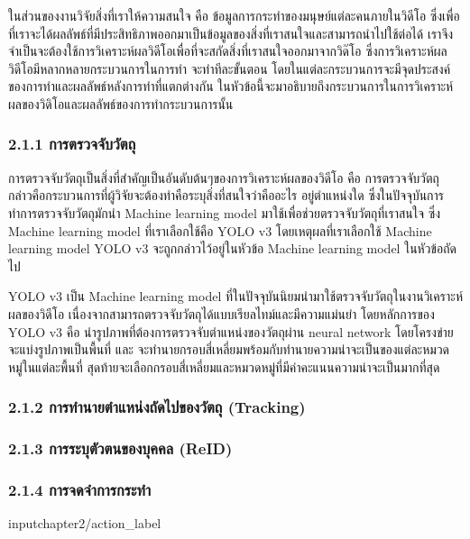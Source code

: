 ในส่วนของงานวิจัยสิ่งที่เราให้ความสนใจ คือ ข้อมูลการกระทำของมนุษย์แต่ละคนภายในวิดีโอ  ซึ่งเพื่อที่เราจะได้ผลลัพธ์ที่มีประสิทธิภาพออกมาเป็นข้อมูลของสิ่งที่เราสนใจและสามารถนำไปใช้ต่อได้ เราจึงจำเป็นจะต้องใช้การวิเคราะห์ผลวิดีโอเพื่อที่จะสกัดสิ่งที่เราสนใจออกมาจากวิด๊โอ ซึ่งการวิเคราะห์ผลวิดีโอมีหลากหลายกระบวนการในการทำ จะทำทีละขั้นตอน โดยในแต่ละกระบวนการจะมีจุดประสงค์ของการทำและผลลัพธ์หลังการทำที่แตกต่างกัน ในหัวข้อนี้จะมาอธิบายถึงกระบวนการในการวิเคราะห์ผลของวิดิโอและผลลัพธ์ของการทำกระบวนการนั้น

\subsubsection*{2.1.1 การตรวจจับวัตถุ}
การตรวจจับวัตถุเป็นสิ่งที่สำคัญเป็นอันดับต้นๆของการวิเคราะห์ผลของวิดีโอ คือ การตรวจจับวัตถุ กล่าวคือกระบวนการที่ผู้วิจัยจะต้องทำคือระบุสิ่งที่สนใจว่าคืออะไร อยู่ตำแหน่งใด ซึ่งในปัจจุบันการทำการตรวจจับวัตถุมักนำ Machine learning model มาใช้เพื่อช่วยตรวจจับวัตถุที่เราสนใจ ซึ่ง Machine learning model ที่เราเลือกใช้คือ YOLO v3 โดยเหตุผลที่เราเลือกใช้ Machine learning model YOLO v3 จะถูกกล่าวไว้อยู่ในหัวข้อ Machine learning model ในหัวข้อถัดไป
\par
YOLO v3 เป็น Machine learning model ที่ในปัจจุบันนิยมนำมาใช้ตรวจจับวัตถุในงานวิเคราะห์ผลของวิดีโอ เนื่องจากสามารถตรวจจับวัตถุได้แบบเรียลไทม์และมีความแม่นยำ โดยหลักการของ YOLO v3 คือ นำรูปภาพที่ต้องการตรวจจับตำแหน่งของวัตถุผ่าน neural network โดยโครงข่ายจะแบ่งรูปภาพเป็นพื้นที่ และ จะทำนายกรอบสี่เหลี่ยมพร้อมกับทำนายความน่าจะเป็นของแต่ละหมวดหมู่ในแต่ละพื้นที่ สุดท้ายจะเลือกกรอบสี่เหลี่ยมและหมวดหมู่ที่มีค่าคะแนนความน่าจะเป็นมากที่สุด

\subsubsection*{2.1.2 การทำนายตำแหน่งถัดไปของวัตถุ (Tracking)}


\subsubsection*{2.1.3 การระบุตัวตนของบุคคล (ReID)}


\subsubsection*{2.1.4 การจดจำการกระทำ}
input{chapter2/action_label}